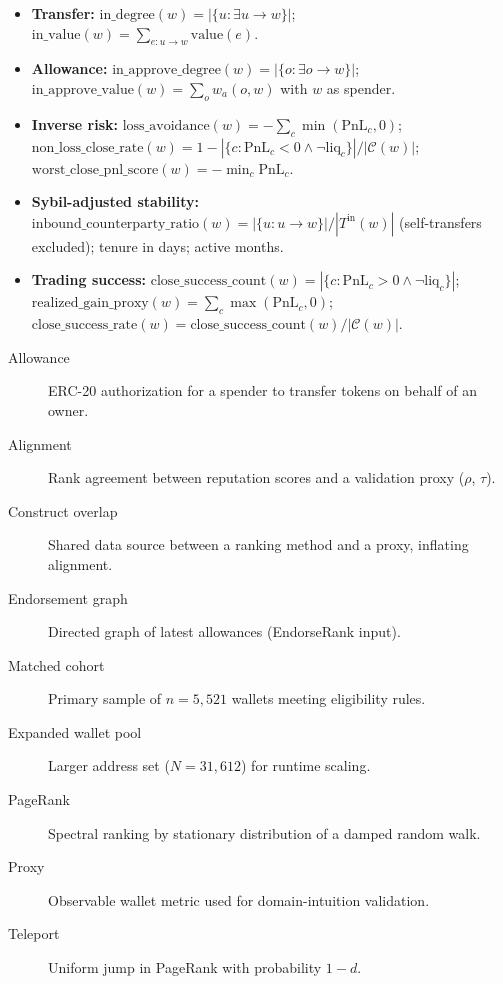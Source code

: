 \begin{itemize}
\item \textbf{Transfer:} $\mathrm{in\_degree}(w)=|\{u:\exists u\to w\}|$; $\mathrm{in\_value}(w)=\sum_{e:u\to w}\mathrm{value}(e)$.

\item \textbf{Allowance:} $\mathrm{in\_approve\_degree}(w)=|\{o:\exists o\to w\}|$; $\mathrm{in\_approve\_value}(w)=\sum_o w_a(o,w)$ with $w$ as spender.

\item \textbf{Inverse risk:} $\mathrm{loss\_avoidance}(w)=-\sum_c\min(\mathrm{PnL}_c,0)$; $\mathrm{non\_loss\_close\_rate}(w)=1-|\{c:\mathrm{PnL}_c<0\land\neg\mathrm{liq}_c\}|/|\mathcal{C}(w)|$; $\mathrm{worst\_close\_pnl\_score}(w)=-\min_c\mathrm{PnL}_c$.

\item \textbf{Sybil-adjusted stability:} $\mathrm{inbound\_counterparty\_ratio}(w)=|\{u:u\to w\}|/|T^{\mathrm{in}}(w)|$ (self-transfers excluded); tenure in days; active months.

\item \textbf{Trading success:} $\mathrm{close\_success\_count}(w)=|\{c:\mathrm{PnL}_c>0\land\neg\mathrm{liq}_c\}|$; $\mathrm{realized\_gain\_proxy}(w)=\sum_c\max(\mathrm{PnL}_c,0)$; $\mathrm{close\_success\_rate}(w)=\mathrm{close\_success\_count}(w)/|\mathcal{C}(w)|$.
\end{itemize}


\begin{description}
\item[Allowance] ERC-20 authorization for a spender to transfer tokens on behalf of an owner.
\item[Alignment] Rank agreement between reputation scores and a validation proxy ($\rho$, $\tau$).
\item[Construct overlap] Shared data source between a ranking method and a proxy, inflating alignment.
\item[Endorsement graph] Directed graph of latest allowances (EndorseRank input).
\item[Matched cohort] Primary sample of $n=5{,}521$ wallets meeting eligibility rules.
\item[Expanded wallet pool] Larger address set ($N=31{,}612$) for runtime scaling.
\item[PageRank] Spectral ranking by stationary distribution of a damped random walk.
\item[Proxy] Observable wallet metric used for domain-intuition validation.
\item[Teleport] Uniform jump in PageRank with probability $1-d$.
\end{description}
